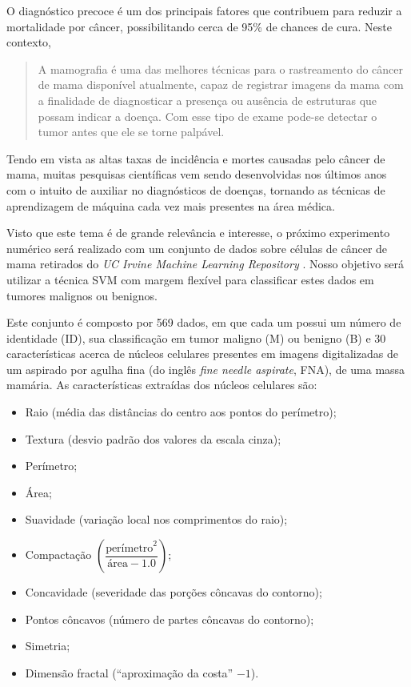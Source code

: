 \documentclass[12pt,a4paper]{scrartcl}
\theoremstyle{definition}%
\begin{document}
O diagnóstico precoce é um dos principais fatores que contribuem para
reduzir a mortalidade por câncer, possibilitando cerca de 95\% de
chances de cura. Neste contexto, 
\begin{quote}
{\flushright A mamografia é uma das melhores
técnicas para o rastreamento do câncer de mama disponível atualmente,
capaz de registrar imagens da mama com a finalidade de diagnosticar a
presença ou ausência de estruturas que possam indicar a doença. Com esse
tipo de exame pode-se detectar o tumor antes que ele se torne palpável. \textcite[p. 229]{Silva&Leal&Lima}}   
\end{quote}

Tendo em vista as altas taxas
de incidência e mortes causadas pelo câncer de mama, muitas pesquisas
científicas vem sendo desenvolvidas nos últimos anos com o intuito de
auxiliar no diagnósticos de doenças, tornando as técnicas de
aprendizagem de máquina cada vez mais presentes na área médica.

Visto que este tema é de grande relevância e interesse, o próximo experimento numérico será realizado com um conjunto de dados sobre células de câncer de mama retirados do \emph{UC Irvine Machine Learning
Repository} \cite{Dua:2019}. Nosso objetivo será utilizar a técnica SVM com margem
flexível para classificar estes dados em tumores malignos ou benignos.

Este conjunto é composto por 569 dados, em que cada um possui um número
de identidade (ID), sua classificação em tumor maligno (M) ou benigno
(B) e 30 características acerca de núcleos celulares presentes em
imagens digitalizadas de um aspirado por agulha fina (do inglês
\emph{fine needle aspirate}, FNA), de uma massa mamária. As
características extraídas dos núcleos celulares são:

\begin{itemize}
\item
  Raio (média das distâncias do centro aos pontos do perímetro);
\item
  Textura (desvio padrão dos valores da escala cinza);
\item
  Perímetro;
\item
  Área;
\item
  Suavidade (variação local nos comprimentos do raio);
\item
  Compactação $\left( \dfrac{\text{perímetro}^{2}}{\text{área} - 1.0} \right) $;
\item
  Concavidade (severidade das porções côncavas do contorno);
\item
  Pontos côncavos (número de partes côncavas do contorno);
\item
  Simetria;
\item
  Dimensão fractal (``aproximação da costa'' $- 1$).
\end{itemize}
\end{document}
